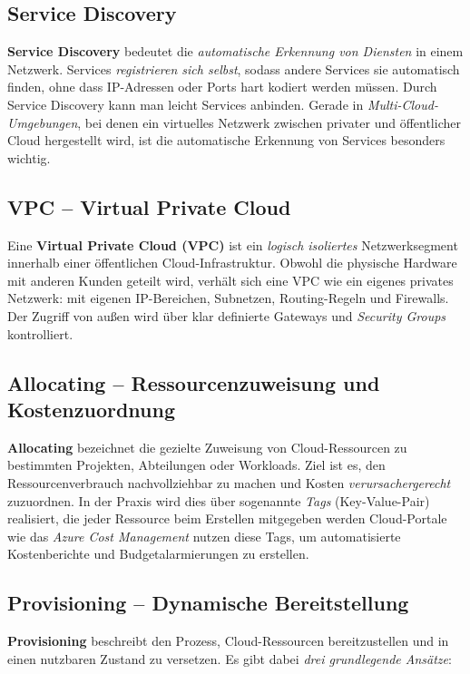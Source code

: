 \subsection{Service Discovery}
\textbf{Service Discovery} bedeutet die \emph{automatische Erkennung von Diensten} in einem Netzwerk. Services \emph{registrieren sich selbst}, sodass andere Services sie automatisch finden, ohne dass IP-Adressen oder Ports hart kodiert werden müssen. Durch Service Discovery kann man leicht Services anbinden. Gerade in \textit{Multi-Cloud-Umgebungen}, bei denen ein virtuelles Netzwerk zwischen privater und öffentlicher Cloud hergestellt wird, ist die automatische Erkennung von Services besonders wichtig.

\subsection{VPC – Virtual Private Cloud}
Eine \textbf{Virtual Private Cloud (VPC)} ist ein \emph{logisch isoliertes} Netzwerksegment
innerhalb einer öffentlichen Cloud-Infrastruktur. Obwohl die physische Hardware
mit anderen Kunden geteilt wird, verhält sich eine VPC wie ein eigenes privates
Netzwerk: mit eigenen IP-Bereichen, Subnetzen, Routing-Regeln und Firewalls.
Der Zugriff von außen wird über klar definierte Gateways und \textit{Security Groups}
kontrolliert.

\subsection{Allocating -- Ressourcenzuweisung und Kostenzuordnung}
\textbf{Allocating} bezeichnet die gezielte Zuweisung von Cloud-Ressourcen zu bestimmten
Projekten, Abteilungen oder Workloads. Ziel ist es, den Ressourcenverbrauch
nachvollziehbar zu machen und Kosten \emph{verursachergerecht} zuzuordnen.
In der Praxis wird dies über sogenannte \textit{Tags} (Key-Value-Pair)
realisiert, die jeder Ressource beim Erstellen mitgegeben werden
Cloud-Portale wie das \textit{Azure Cost Management} nutzen diese Tags, um automatisierte
Kostenberichte und Budgetalarmierungen zu erstellen.
\subsection{Provisioning -- Dynamische Bereitstellung}
\textbf{Provisioning} beschreibt den Prozess, Cloud-Ressourcen bereitzustellen und in
einen nutzbaren Zustand zu versetzen. Es gibt dabei \emph{drei grundlegende Ansätze}:

